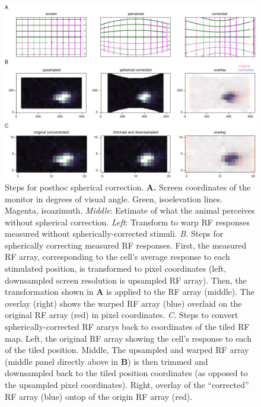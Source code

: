 \begin{figure}[t!]
\includegraphics[width=\textwidth]{figures/supplemental/fig_s8_spherical_correction_steps/fig_s8_spherical_correction_steps.pdf}
    \vspace{.1in}
    \caption[Spherical correction]{Steps for posthoc spherical correction.
    \textbf{A.} Screen coordinates of the monitor in degrees of visual angle. Green, isoelevation lines. Magenta, isoazimuth. \textit{Middle}: Estimate of what the animal perceives without spherical correction. \textit{Left}: Transform to warp RF responses measured without spherically-corrected stimuli. 
    \textit{B.} Steps for spherically correcting measured RF responses. First, the measured RF array, corresponding to the cell's average response to each stimulated position, is transformed to pixel coordinates (left, downsampled screen resolution is upsampled RF array). Then, the transformation shown in \textbf{A} is applied to the RF array (middle). The overlay (right) shows the warped RF array (blue) overlaid on the original RF array (red) in pixel coordinates.
    \textit{C.} Steps to convert spherically-corrected RF ararys back to coordinates of the tiled RF map. Left, the original RF array showing the cell's response to each of the tiled position. Middle, The upsampled and warped RF array (middle panel directly above in \textbf{B}) is then trimmed and downsampled back to the tiled position coordinates (as opposed to the upsampled pixel coordinates). Right, overlay of the ``corrected'' RF array (blue) ontop of the origin RF array (red).
    \label{supfig:spherical_correction_steps}}
\end{figure}


